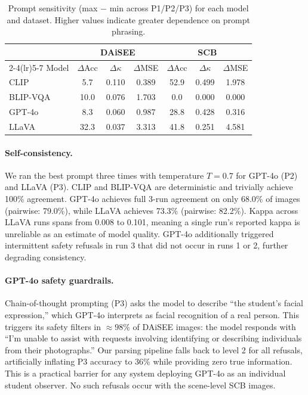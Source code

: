 \begin{table}[t]
\centering
\small
\caption{Prompt sensitivity (max $-$ min across P1/P2/P3) for each model
  and dataset.  Higher values indicate greater dependence on prompt phrasing.}
\label{tab:sensitivity}
\setlength{\tabcolsep}{4pt}
\begin{tabular}{@{}lcccccc@{}}
\toprule
& \multicolumn{3}{c}{DAiSEE} & \multicolumn{3}{c}{SCB} \\
\cmidrule(lr){2-4}\cmidrule(lr){5-7}
Model & $\Delta$Acc & $\Delta\kappa$ & $\Delta$MSE & $\Delta$Acc & $\Delta\kappa$ & $\Delta$MSE \\
\midrule
CLIP     & 5.7  & 0.110 & 0.389 & 52.9 & 0.499 & 1.978 \\
BLIP-VQA & 10.0 & 0.076 & 1.703 & 0.0  & 0.000 & 0.000 \\
GPT-4o   & 8.3  & 0.060 & 0.987 & 28.8 & 0.428 & 0.316 \\
LLaVA    & 32.3 & 0.037 & 3.313 & 41.8 & 0.251 & 4.581 \\
\bottomrule
\end{tabular}
\end{table}

\paragraph{Self-consistency.}
We ran the best prompt three times with temperature $T\!=\!0.7$ for
GPT-4o (P2) and LLaVA (P3).  CLIP and BLIP-VQA are deterministic and
trivially achieve 100\% agreement.  GPT-4o achieves full 3-run agreement
on only 68.0\% of images (pairwise: 79.0\%), while LLaVA achieves 73.3\%
(pairwise: 82.2\%).  Kappa across LLaVA runs spans from 0.008 to 0.101,
meaning a single run's reported kappa is unreliable as an estimate of
model quality.  GPT-4o additionally triggered intermittent safety refusals
in run 3 that did not occur in runs 1 or 2, further degrading consistency.

\paragraph{GPT-4o safety guardrails.}
Chain-of-thought prompting (P3) asks the model to describe ``the
student's facial expression,'' which GPT-4o interprets as facial
recognition of a real person.  This triggers its safety filters in
$\approx\!98\%$ of DAiSEE images: the model responds with ``I'm unable
to assist with requests involving identifying or describing individuals
from their photographs.''  Our parsing pipeline falls back to level 2
for all refusals, artificially inflating P3 accuracy to 36\% while
providing zero true information.  This is a practical barrier for
any system deploying GPT-4o as an individual student observer.
No such refusals occur with the scene-level SCB images.
